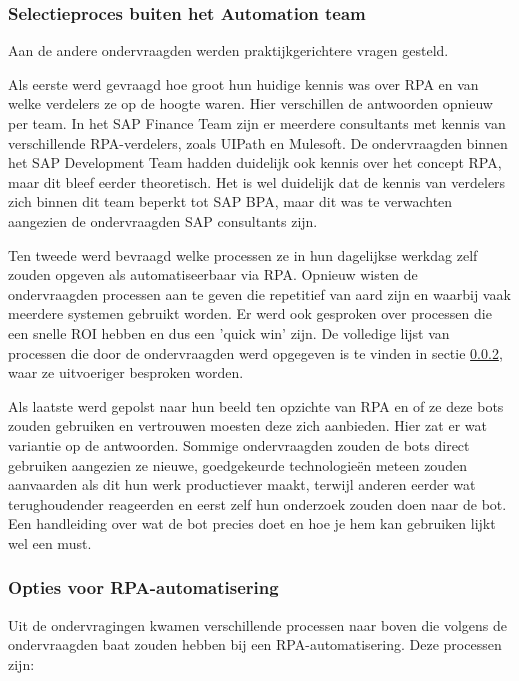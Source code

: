 \subsubsection{Selectieproces buiten het Automation team}
\label{subsubsec:selectieproces-buiten-het-automation-team}

Aan de andere ondervraagden werden praktijkgerichtere vragen gesteld.

Als eerste werd gevraagd hoe groot hun huidige kennis was over RPA en van welke verdelers ze op de hoogte waren. Hier verschillen de antwoorden opnieuw per team. In het SAP Finance Team zijn er meerdere consultants met kennis van verschillende RPA-verdelers, zoals UIPath en Mulesoft.
De ondervraagden binnen het SAP Development Team hadden duidelijk ook kennis over het concept RPA, maar dit bleef eerder theoretisch. Het is wel duidelijk dat de kennis van verdelers zich binnen dit team beperkt tot SAP BPA, maar dit was te verwachten aangezien de ondervraagden SAP consultants zijn.

Ten tweede werd bevraagd welke processen ze in hun dagelijkse werkdag zelf zouden opgeven als automatiseerbaar via RPA. Opnieuw wisten de ondervraagden processen aan te geven die repetitief van aard zijn en waarbij vaak meerdere systemen gebruikt worden. Er werd ook gesproken over processen die een snelle ROI hebben en dus een 'quick win' zijn. De volledige lijst van processen die door de ondervraagden werd opgegeven is te vinden in sectie \ref{subsubsec:opties-voor-rpa-automatisering}, waar ze uitvoeriger besproken worden.

Als laatste werd gepolst naar hun beeld ten opzichte van RPA en of ze deze bots zouden gebruiken en vertrouwen moesten deze zich aanbieden. Hier zat er wat variantie op de antwoorden. Sommige ondervraagden zouden de bots direct gebruiken aangezien ze nieuwe, goedgekeurde technologieën meteen zouden aanvaarden als dit hun werk productiever maakt, terwijl anderen eerder wat terughoudender reageerden en eerst zelf hun onderzoek zouden doen naar de bot. Een handleiding over wat de bot precies doet en hoe je hem kan gebruiken lijkt wel een must.

\subsubsection{Opties voor RPA-automatisering}
\label{subsubsec:opties-voor-rpa-automatisering}

Uit de ondervragingen kwamen verschillende processen naar boven die volgens de ondervraagden baat zouden hebben bij een RPA-automatisering.
Deze processen zijn:

